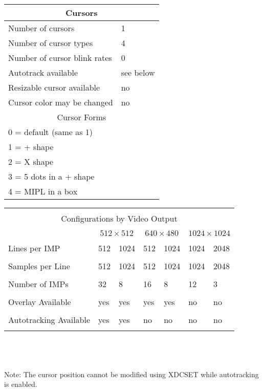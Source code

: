 \begin{tabular}{|l l|}
\hline
\multicolumn{2}{|c|}{Cursors}\\ 
\hline
Number of cursors & 1\\
Number of cursor types & 4\\
Number of cursor blink rates & 0\\
Autotrack available & see below\\
Resizable cursor available & no\\
Cursor color may be changed & no\\
\hline \hline 
\multicolumn{2}{|c|}{Cursor Forms}\\
\hline
0 = default (same as 1) & \\
1 =  + shape & \\
2 = X shape & \\
3 = 5 dots in a + shape & \\
4 = MIPL in a box & \\
\hline
\end{tabular}

\begin{tabular}{|l|l|l|l|l|l|l|}
\hline
\multicolumn{7}{|c|}{ }\\
\multicolumn{7}{|c|}{Configurations by Video Output}\\
\multicolumn{7}{|c|}{ }\\
\hline
\multicolumn{1}{|c|}{ }
&\multicolumn{2}{|c|}{$512 \times 512$}
&\multicolumn{2}{|c|}{$640 \times 480$}
&\multicolumn{2}{|c|}{$1024 \times 1024$}\\
\hline
& & & & & & \\
Lines per IMP & 512 & 1024 & 512 & 1024 & 1024 & 2048 \\
& & & & & & \\
Samples per Line & 512 & 1024 & 512 & 1024 & 1024 & 2048 \\
& & & & & & \\
Number of IMPs & 32 & 8 & 16 & 8 & 12 & 3 \\
& & & & & & \\
Overlay Available & yes & yes & yes & yes & no & no \\
& & & & & & \\
Autotracking Available & yes & yes & no & no & no & no \\
& & & & & & \\
\hline
\end{tabular}
\\
\\
\\
Note: The cursor position cannot be modified using XDCSET while
autotracking is enabled.
\cleardoublepage
